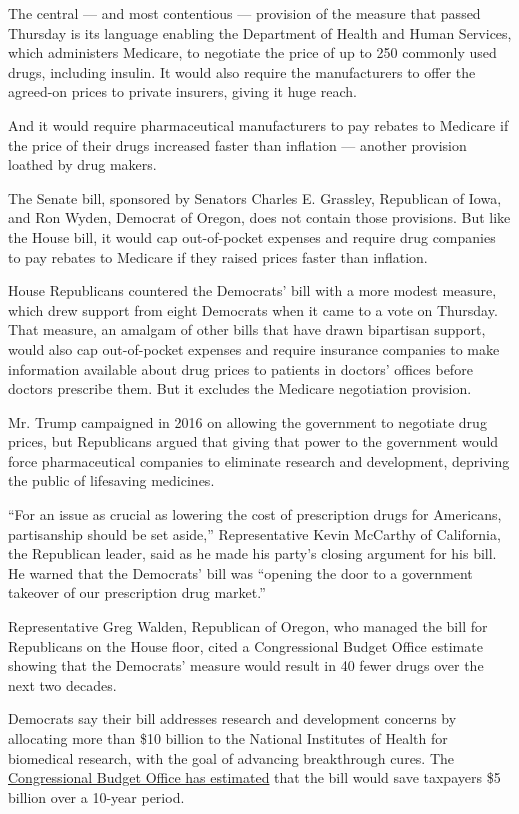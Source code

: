 The central --- and most contentious --- provision of the measure that
passed Thursday is its language enabling the Department of Health and
Human Services, which administers Medicare, to negotiate the price of up
to 250 commonly used drugs, including insulin. It would also require the
manufacturers to offer the agreed-on prices to private insurers, giving
it huge reach.

And it would require pharmaceutical manufacturers to pay rebates to
Medicare if the price of their drugs increased faster than inflation ---
another provision loathed by drug makers.

The Senate bill, sponsored by Senators Charles E. Grassley, Republican
of Iowa, and Ron Wyden, Democrat of Oregon, does not contain those
provisions. But like the House bill, it would cap out-of-pocket expenses
and require drug companies to pay rebates to Medicare if they raised
prices faster than inflation.

House Republicans countered the Democrats' bill with a more modest
measure, which drew support from eight Democrats when it came to a vote
on Thursday. That measure, an amalgam of other bills that have drawn
bipartisan support, would also cap out-of-pocket expenses and require
insurance companies to make information available about drug prices to
patients in doctors' offices before doctors prescribe them. But it
excludes the Medicare negotiation provision.

Mr. Trump campaigned in 2016 on allowing the government to negotiate
drug prices, but Republicans argued that giving that power to the
government would force pharmaceutical companies to eliminate research
and development, depriving the public of lifesaving medicines.

``For an issue as crucial as lowering the cost of prescription drugs for
Americans, partisanship should be set aside,'' Representative Kevin
McCarthy of California, the Republican leader, said as he made his
party's closing argument for his bill. He warned that the Democrats'
bill was ``opening the door to a government takeover of our prescription
drug market.''

Representative Greg Walden, Republican of Oregon, who managed the bill
for Republicans on the House floor, cited a Congressional Budget Office
estimate showing that the Democrats' measure would result in 40 fewer
drugs over the next two decades.

Democrats say their bill addresses research and development concerns by
allocating more than \$10 billion to the National Institutes of Health
for biomedical research, with the goal of advancing breakthrough cures.
The \href{https://www.cbo.gov/publication/55936}{Congressional Budget
Office has estimated} that the bill would save taxpayers \$5 billion
over a 10-year period.

